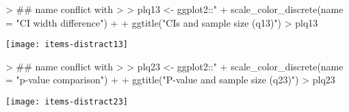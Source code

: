 \documentclass[11pt]{article}
\begin{document}
\begin{Schunk}
\begin{Sinput}
> ## name conflict with %+%, which is why I need to use colon notation here
> 
> plq13 <- ggplot2::"%+%"(plq06, d13) +
+     scale_color_discrete(name = "CI width difference") +
+     ggtitle("CIs and sample size (q13)")
> plq13
\end{Sinput}
\end{Schunk}
\texttt{[image: items-distract13]}

\begin{Schunk}
\begin{Sinput}
> ## name conflict with %+%, which is why I need to use colon notation here
> 
> plq23 <- ggplot2::"%+%"(plq06, d23) + 
+     scale_color_discrete(name = "p-value comparison") +
+     ggtitle("P-value and sample size (q23)")
> plq23
\end{Sinput}
\end{Schunk}
\texttt{[image: items-distract23]}
\end{document}
